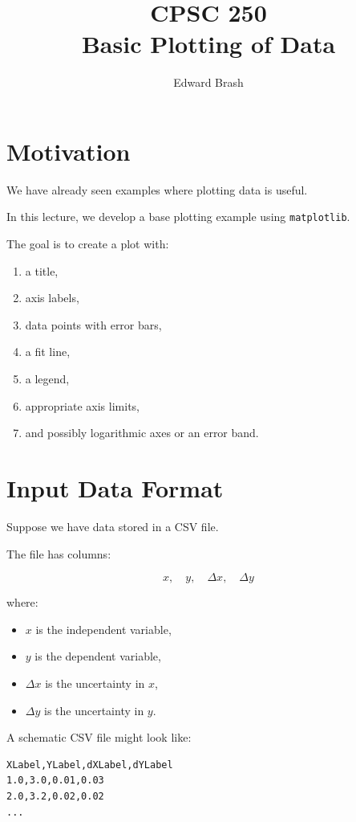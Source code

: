 \documentclass[11pt]{article}
\title{CPSC 250 \\ Basic Plotting of Data}
\author{Edward Brash}
\date{}
\begin{document}
\maketitle

\section{Motivation}

We have already seen examples where plotting data is useful.

In this lecture, we develop a base plotting example using \texttt{matplotlib}.

The goal is to create a plot with:

\begin{enumerate}
    \item a title,
    \item axis labels,
    \item data points with error bars,
    \item a fit line,
    \item a legend,
    \item appropriate axis limits,
    \item and possibly logarithmic axes or an error band.
\end{enumerate}

\section{Input Data Format}

Suppose we have data stored in a CSV file.

The file has columns:

\[
x,\quad y,\quad \Delta x,\quad \Delta y
\]

where:

\begin{itemize}
    \item \(x\) is the independent variable,
    \item \(y\) is the dependent variable,
    \item \(\Delta x\) is the uncertainty in \(x\),
    \item \(\Delta y\) is the uncertainty in \(y\).
\end{itemize}

A schematic CSV file might look like:

\begin{lstlisting}
XLabel,YLabel,dXLabel,dYLabel
1.0,3.0,0.01,0.03
2.0,3.2,0.02,0.02
...
\end{lstlisting}
\end{document}
